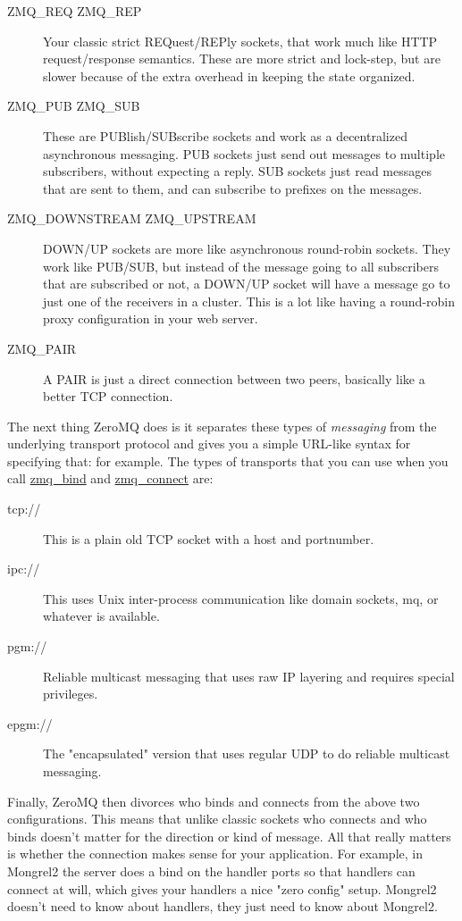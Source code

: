 \begin{description}
\item [ZMQ\_REQ ZMQ\_REP]  Your classic strict REQuest/REPly sockets, that work much like 
    HTTP request/response semantics.  These are more strict and lock-step, but are slower
    because of the extra overhead in keeping the state organized.
\item [ZMQ\_PUB ZMQ\_SUB]  These are PUBlish/SUBscribe sockets and work as a decentralized 
    asynchronous messaging.  PUB sockets just send out messages to multiple subscribers, without
    expecting a reply.  SUB sockets just read messages that are sent to them, and can subscribe
    to prefixes on the messages.
\item [ZMQ\_DOWNSTREAM ZMQ\_UPSTREAM] DOWN/UP sockets are more like asynchronous round-robin 
    sockets.  They work like PUB/SUB, but instead of the message going to all subscribers that
    are subscribed or not, a DOWN/UP socket will have a message go to just one of the receivers
    in a cluster.  This is a lot like having a round-robin proxy configuration in your web server.
\item [ZMQ\_PAIR] A PAIR is just a direct connection between two peers, basically like a better
    TCP connection.
\end{description}

The next thing ZeroMQ does is it separates these types of \emph{messaging} from the underlying 
transport protocol and gives you a simple URL-like syntax for specifying that: 
for example.  The types of transports that you can use when you call \href{http://api.zeromq.org/zmq\_bind.html}{zmq\_bind}
and \href{http://api.zeromq.org/zmq\_connect.html}{zmq\_connect} are:

\begin{description}
\item [tcp://] This is a plain old TCP socket with a host and portnumber.
\item [ipc://] This uses Unix inter-process communication like domain sockets, mq, or whatever is available.
\item [pgm://] Reliable multicast messaging that uses raw IP layering and requires special privileges.
\item [epgm://] The "encapsulated" version that uses regular UDP to do reliable multicast messaging.
\end{description}

Finally, ZeroMQ then divorces who binds and connects from the above two
configurations.  This means that unlike classic sockets who connects and who
binds doesn't matter for the direction or kind of message.  All that really
matters is whether the connection makes sense for your application.  For
example, in Mongrel2 the server does a bind on the handler ports so that
handlers can connect at will, which gives your handlers a nice "zero config"
setup.  Mongrel2 doesn't need to know about handlers, they just need to know
about Mongrel2.

